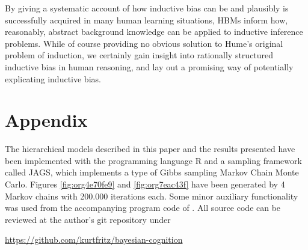 \documentclass[11pt, a4paper]{article}
\begin{document}
By giving a systematic account of how inductive bias can be and plausibly is
successfully acquired in many human learning situations, HBMs inform how,
reasonably, abstract background knowledge can be applied to inductive inference
problems. While of course providing no obvious solution to Hume's original problem of
induction, we certainly gain insight into rationally structured inductive bias
in human reasoning, and lay out a promising way of potentially explicating
inductive bias.

\section{Appendix}
\label{sec:orgce6e5db}

The hierarchical models described in this paper and the results presented have
been implemented with the programming language R and a sampling framework called
JAGS, which implements a type of Gibbs sampling Markov Chain Monte Carlo.
Figures \ref{fig:org4e70fe9} and \ref{fig:org7eac43f} have been generated by 4
Markov chains with 200.000 iterations each. Some minor auxiliary functionality
was used from the accompanying program code of \citet{kruschke11_doing_bayes}.
All source code can be reviewed at the author's git repository under

\url{https://github.com/kurtfritz/bayesian-cognition}

\printbibliography
\end{document}
